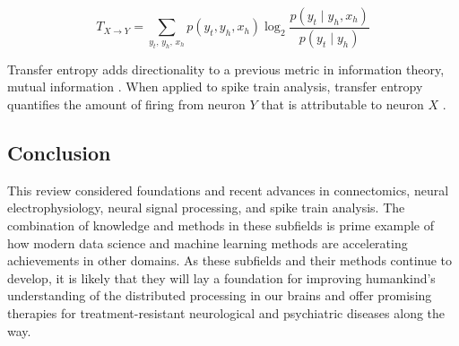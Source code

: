 \documentclass[11pt]{article}
\newcommand{\subsectionwithindent}[1]{
    \subsection*{#1}
    \hspace{\parindent} %
}
\begin{document}
\begin{equation}
    T_{X \to Y} = \sum_{y_t,\, y_h,\, x_h}
    p(y_t, y_h, x_h)
    \log_{2} \frac{p(y_t \mid y_h, x_h)}{p(y_t \mid y_h)}
    \label{eq:te}
\end{equation}

Transfer entropy adds directionality to a previous metric in information theory, mutual information \cite{schreiber2000te}. When applied to spike train analysis, transfer entropy quantifies the amount of firing from neuron $Y$ that is attributable to neuron $X$ \cite{schreiber2000te, kobayashi2025connections}.

\subsectionwithindent{Conclusion}
This review considered foundations and recent advances in connectomics, neural electrophysiology, neural signal processing, and spike train analysis. The combination of knowledge and methods in these subfields is prime example of how modern data science and machine learning methods are accelerating achievements in other domains. As these subfields and their methods continue to develop, it is likely that they will lay a foundation for improving humankind's understanding of the distributed processing in our brains and offer promising therapies for treatment-resistant neurological and psychiatric diseases along the way.

\newpage
\printbibliography
\end{document}
